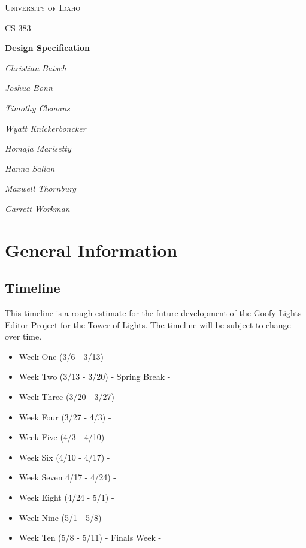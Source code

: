 \documentclass[12pt, oneside]{article}
\begin{document}
\centering
	{\scshape\LARGE University of Idaho \par}
	\vspace{1cm}
	{\scshape\Large CS 383\par}
	\vspace{1.5cm}
	{\huge\bfseries Design Specification\par}
	\vspace{2cm}
	{\Large\itshape Christian Baisch\par}
	{\Large\itshape Joshua Bonn\par}
	{\Large\itshape Timothy Clemans\par}
	{\Large\itshape Wyatt Knickerboncker\par}
	{\Large\itshape Homaja Marisetty\par}
	{\Large\itshape Hanna Salian\par}
	{\Large\itshape Maxwell Thornburg\par}
	{\Large\itshape Garrett Workman\par}
	\vfill

\section{General Information}

\subsection{Timeline}

This timeline is a rough estimate for the future development of the Goofy Lights Editor Project for the Tower of Lights. 
The timeline will be subject to change over time.

\begin{itemize}
\item
Week One (3/6 - 3/13) - 
\item
Week Two (3/13 - 3/20) - Spring Break - 
\item
Week Three (3/20 - 3/27) -  
\item
Week Four (3/27 - 4/3) -
\item
Week Five (4/3 - 4/10) -
\item
Week Six (4/10 - 4/17) -
\item
Week Seven 4/17 - 4/24) -
\item
Week Eight (4/24 - 5/1) - 
\item
Week Nine (5/1 - 5/8) - 
\item
Week Ten  (5/8 - 5/11) - Finals Week - 


\end{itemize}
\end{document}
